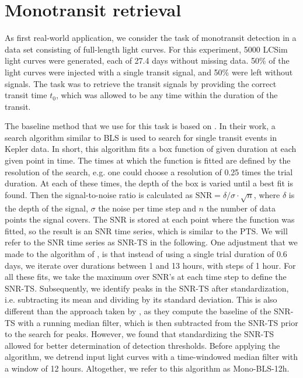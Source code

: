 
\section{Monotransit retrieval}
\label{sec:exp_monos}

As first real-world application, we consider the task of monotransit detection in a data set consisting of full-length light curves. For this experiment, 5000 LCSim light curves were generated, each of 27.4 days without missing data. 50\% of the light curves were injected with a single transit signal, and 50\% were left without signals. The task was to retrieve the transit signals by providing the correct transit time $t_0$, which was allowed to be any time within the duration of the transit.

The baseline method that we use for this task is based on \cite{foreman2016population}. In their work, a search algorithm similar to BLS is used to search for single transit events in Kepler data. In short, this algorithm fits a box function of given duration at each given point in time. The times at which the function is fitted are defined by the resolution of the search, e.g. one could choose a resolution of 0.25 times the trial duration. At each of these times, the depth of the box is varied until a best fit is found. Then the signal-to-noise ratio is calculated as $\text{SNR} = \delta/\sigma\cdot\sqrt{n} $, where $\delta$ is the depth of the signal, $\sigma$ the noise per time step and $n$ the number of data points the signal covers. The SNR is stored at each point where the function was fitted, so the result is an SNR time series, which is similar to the PTS. We will refer to the SNR time series as SNR-TS in the following. One adjustment that we made to the algorithm of \cite{foreman2016population}, is that instead of using a single trial duration of 0.6 days, we iterate over durations between 1 and 13 hours, with steps of 1 hour. For all these fits, we take the maximum over SNR's at each time step to define the SNR-TS. Subsequently, we identify peaks in the SNR-TS after standardization, i.e. subtracting its mean and dividing by its standard deviation. This is also different than the approach taken by \cite{foreman2016population}, as they compute the baseline of the SNR-TS with a running median filter, which is then subtracted from the SNR-TS prior to the search for peaks. However, we found that standardizing the SNR-TS allowed for better determination of detection thresholds. Before applying the algorithm, we detrend input light curves with a time-windowed median filter with a window of 12 hours. Altogether, we refer to this algorithm as Mono-BLS-12h.

